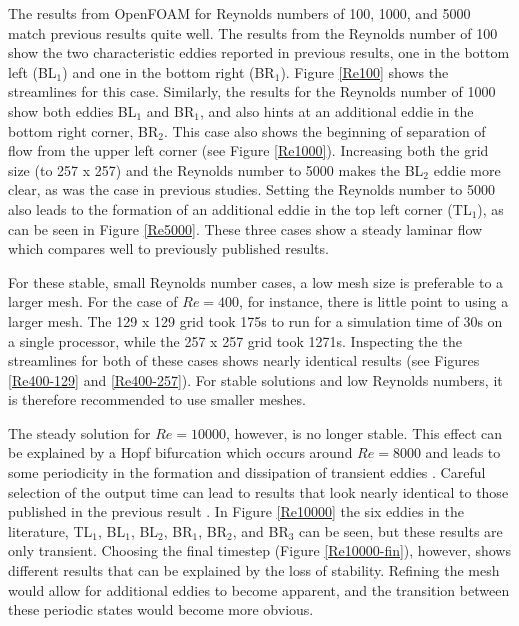 \documentclass[twocolumn,10pt]{asme2ej}
\begin{document}
The results from OpenFOAM for Reynolds numbers of 100, 1000, and 5000 match previous results quite well. The results from the Reynolds number of 100 show the two characteristic eddies reported in previous results, one in the bottom left (BL$_1$) and one in the bottom right (BR$_1$). Figure \ref{Re100} shows the streamlines for this case. Similarly, the results for the Reynolds number of 1000 show both eddies BL$_1$ and BR$_1$, and also hints at an additional eddie in the bottom right corner, BR$_2$. This case also shows the beginning of separation of flow from the upper left corner (see Figure \ref{Re1000}). Increasing both the grid size (to 257 x 257) and the Reynolds number to 5000 makes the BL$_2$ eddie more clear, as was the case in previous studies. Setting the Reynolds number to 5000 also leads to the formation of an additional eddie in the top left corner (TL$_1$), as can be seen in Figure \ref{Re5000}. These three cases show a steady laminar flow which compares well to previously published results.

For these stable, small Reynolds number cases, a low mesh size is preferable to a larger mesh. For the case of $Re = 400$, for instance, there is little point to using a larger mesh. The 129 x 129 grid took 175s to run for a simulation time of 30s on a single processor, while the 257 x 257 grid took 1271s. Inspecting the the streamlines for both of these cases shows nearly identical results (see Figures \ref{Re400-129} and \ref{Re400-257}). For stable solutions and low Reynolds numbers, it is therefore recommended to use smaller meshes.

The steady solution for $Re = 10000$, however, is no longer stable. This effect can be explained by a Hopf bifurcation which occurs around $Re = 8000$ and leads to some periodicity in the formation and dissipation of transient eddies \cite{bruneau20062d}. Careful selection of the output time can lead to results that look nearly identical to those published in the previous result \cite{ghia1982high}. In Figure \ref{Re10000} the six eddies in the literature, TL$_1$, BL$_1$, BL$_2$, BR$_1$, BR$_2$, and BR$_3$ can be seen, but these results are only transient. Choosing the final timestep (Figure \ref{Re10000-fin}), however, shows different results that can be explained by the loss of stability. Refining the mesh would allow for additional eddies to become apparent, and the transition between these periodic states would become more obvious.
\end{document}
